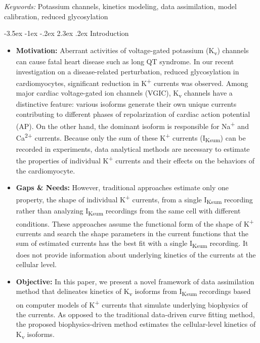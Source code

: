 \documentclass[11pt]{article}
\makeatletter
\renewcommand\section{\@startsection {section}{1}{\z@}%
                                   {-3.5ex \@plus -1ex \@minus -.2ex}%
                                   {2.3ex \@plus.2ex}%
                                   {\normalfont\fontfamily{phv}\fontsize{16}{19}\bfseries}}
\makeatother
\begin{document}
\noindent%
{\it Keywords:} Potassium channels, kinetics modeling, data assimilation, model calibration, reduced glycosylation

{} %


\section{Introduction} \label{s:intro}
\begin{itemize}
    \item \textbf{Motivation:} Aberrant activities of voltage-gated potassium (K\textsubscript{v}) channels can cause fatal heart disease such as long QT syndrome. In our recent investigation on a disease-related perturbation, reduced glycosylation in cardiomyocytes, significant reduction in K\textsuperscript{+} currents was observed. Among major cardiac voltage-gated ion channels (VGIC), K\textsubscript{v} channels have a distinctive feature: various isoforms generate their own unique currents contributing to different phases of repolarization of cardiac action potential (AP). On the other hand, the dominant isoform is responsible for Na\textsuperscript{+} and Ca\textsuperscript{2+} currents. Because only the sum of these K\textsuperscript{+} currents (I\textsubscript{Ksum}) can be recorded in experiments, data analytical methods are necessary to estimate the properties of individual K\textsuperscript{+} currents and their effects on the behaviors of the cardiomyocyte.
    \item \textbf{Gaps \& Needs:} However, traditional approaches estimate only one property, the shape of individual K\textsuperscript{+} currents, from a single I\textsubscript{Ksum} recording rather than analyzing I\textsubscript{Ksum} recordings from the same cell with different conditions. These approaches assume the functional form of the shape of K\textsuperscript{+} currents and search the shape parameters in the current functions that the sum of estimated currents has the best fit with a single I\textsubscript{Ksum} recording. It does not provide information about underlying kinetics of the currents at the cellular level.
    \item \textbf{Objective:} In this paper, we present a novel framework of data assimilation method that delineates kinetics of K\textsubscript{v} isoforms from I\textsubscript{Ksum} recordings based on computer models of K\textsuperscript{+} currents that simulate underlying biophysics of the currents. As opposed to the traditional data-driven curve fitting method, the proposed biophysics-driven method estimates the cellular-level kinetics of K\textsubscript{v} isoforms.

\end{itemize}
\end{document}
